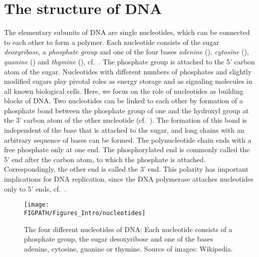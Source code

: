 \section{\label{sec:DNA_structure}The structure of DNA}
The elementary subunits of DNA are  single nucleotides, which can be 
connected to each other to form a polymer. Each nucleotide consists of 
the sugar \emph{deoxyribose}, a \emph{phosphate group} and one of the four bases 
\emph{adenine} (), \emph{cytosine} (), \emph{guanine} () and \emph{thymine} (),
cf.~. The phosphate group is attached to the 5' carbon atom
of the sugar. 
%
%
%
%
%
Nucleotides with different numbers of phosphates and slightly modified sugars
play pivotal roles as energy storage and as signaling molecules in all known biological cells.
Here, we focus on the role of nucleotides as building blocks of DNA.
Two nucleotides can be linked to each other by formation of a
phosphate bond between the phosphate group of one and the hydroxyl group at the 3' carbon 
atom of the other nucleotide (cf.~).
The formation of this bond is independent of the base that is attached to the sugar,
and long chains with an arbitrary sequence of bases can be formed. The polynucleotide chain ends
with a free phosphate only at one end.
The phosphorylated end is commonly called the 5' end after
the carbon atom, to which the phosphate is attached. Correspondingly, the other end
is called the 3' end. This polarity has important implications for DNA replication, since the DNA 
polymerase attaches nucleotides only to 5' ends, cf.~. 
\begin{figure}
\centering
  \texttt{[image: \\FIGPATH/Figures\_Intro/nucleotides]}
\caption[Nucleotides, the elementary subunits of DNA.]{
\label{fig:nucleotides} The four different nucleotides of DNA: Each nucleotide
consists of a phosphate group, the sugar desoxyribose and one of the bases adenine, 
cytosine, guanine or thymine.
 Source of images: Wikipedia.}
\end{figure}

